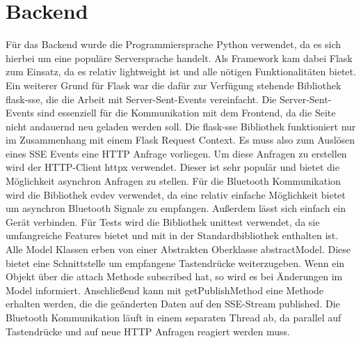 \section{Backend}
Für das Backend wurde die Programmiersprache Python verwendet, da es sich hierbei um eine populäre Serversprache
handelt. Als Framework kam dabei \glqq Flask\grqq{} zum Einsatz, da es relativ lightweight ist und alle nötigen
Funktionalitäten bietet. Ein weiterer Grund für Flask war die dafür zur Verfügung stehende Bibliothek \glqq
flask-sse\grqq{}, die die Arbeit mit Server-Sent-Events vereinfacht. \newline Die Server-Sent-Events sind essenziell
für die Kommunikation mit dem Frontend, da die Seite nicht andauernd neu geladen werden soll. Die \glqq
flask-sse\grqq{} Bibliothek funktioniert nur im Zusammenhang mit einem Flask Request Context. Es muss also zum
Auslösen eines SSE Events eine HTTP Anfrage vorliegen. Um diese Anfragen zu erstellen wird der HTTP-Client \glqq
httpx\grqq{} verwendet. Dieser ist sehr populär und bietet die Möglichkeit asynchron Anfragen zu stellen. \newline
Für die Bluetooth Kommunikation wird die Bibliothek \glqq evdev\grqq{} verwendet, da eine relativ einfache
Möglichkeit bietet um asynchron Bluetooth Signale zu empfangen. Außerdem lässt sich einfach ein Gerät verbinden.
\newline Für Tests wird die Bibliothek \glqq unittest\grqq{} verwendet, da sie umfangreiche Features bietet und mit
in der Standardbibliothek enthalten ist. \newline Alle Model Klassen erben von einer Abstrakten Oberklasse \glqq
abstractModel\grqq{}. Diese bietet eine Schnittstelle um empfangene Tastendrücke weiterzugeben. Wenn ein Objekt über
die \glqq attach\grqq{} Methode subscribed hat, so wird es bei Änderungen im Model informiert. Anschließend kann mit
\glqq getPublishMethod\grqq{} eine Methode erhalten werden, die die geänderten Daten auf den SSE-Stream published.
\newline Die Bluetooth Kommunikation läuft in einem separaten Thread ab, da parallel auf Tastendrücke und auf neue
HTTP Anfragen reagiert werden muss.